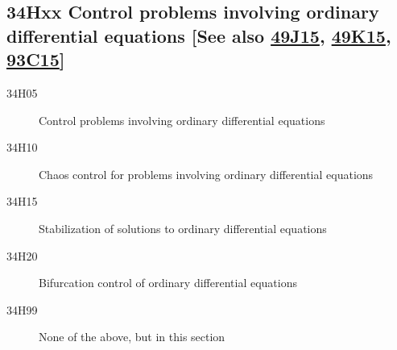 \subsection*{34Hxx  Control problems involving ordinary differential equations [See also \hyperref[49J15]{49J15}, \hyperref[49K15]{49K15}, \hyperref[93C15]{93C15}] }\label{34Hxx}
\begin{description}  
\item [34H05]\label{34H05} Control problems involving ordinary differential equations
\item [34H10]\label{34H10} Chaos control for problems involving ordinary differential equations
\item [34H15]\label{34H15} Stabilization of solutions to ordinary differential equations
\item [34H20]\label{34H20} Bifurcation control of ordinary differential equations
\item [34H99]\label{34H99} None of the above, but in this section
\end{description}
